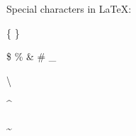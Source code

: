 \documentclass[a4paper,12pt]{article}
\begin{document}
Special characters in LaTeX:

\{ \}

\$ \% \& \# \_

\textbackslash

\textasciicircum

\textasciitilde
\end{document}
